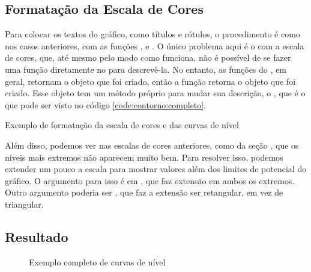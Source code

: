 \subsection{Formatação da Escala de Cores}

    Para colocar os textos do gráfico, como títulos e rótulos, o procedimento é como nos casos anteriores, com as funções ,  e . O único problema aqui é o com a escala de cores, que, até mesmo pelo modo como funciona, não é possível de se fazer uma função diretamente no \pyplot para descrevê-la. No entanto, as funções do \pyplot, em geral, retornam o objeto que foi criado, então a função  retorna o objeto  que foi criado. Esse objeto tem um método próprio para mudar sua descrição, o , que é o que pode ser visto no código \ref{code:contorno:completo}.

    \begin{listing}[H]
        \caption{Exemplo de formatação da escala de cores e das curvas de nível}
        \label{code:contorno:completo}

    \end{listing}

    Além disso, podemos ver nas escalas de cores anteriores, como da seção , que os níveis mais extremos não aparecem muito bem. Para resolver isso, podemos extender um pouco a escala para mostrar valores além dos limites de potencial do gráfico. O argumento para isso é  em , que faz extensão em ambos os extremos. Outro argumento poderia ser , que faz a extensão ser retangular, em vez de triangular.


\subsection{Resultado}

    \begin{figure}[H]
        \centering
        

        \caption{Exemplo completo de curvas de nível}
        \label{fig:contorno:completo}
    \end{figure}
